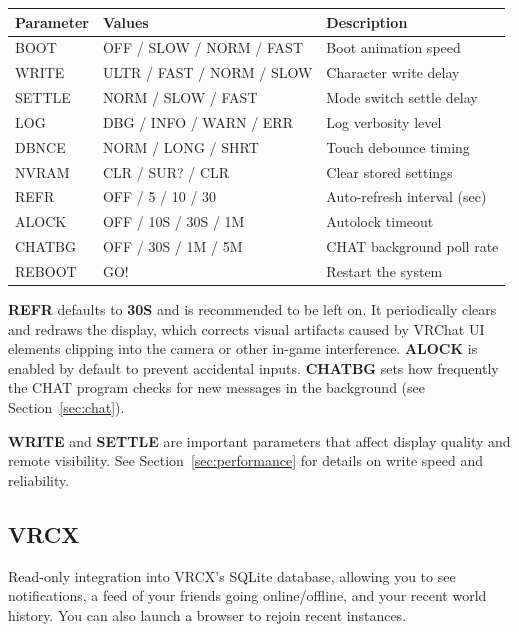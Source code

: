 \documentclass[10pt]{article}
\begin{document}
\begin{center}
{\small
\begin{tabular}{lll}
  \toprule
  \textbf{Parameter} & \textbf{Values} & \textbf{Description} \\
  \midrule
  BOOT & OFF / SLOW / NORM / FAST & Boot animation speed \\
  WRITE & ULTR / FAST / NORM / SLOW & Character write delay \\
  SETTLE & NORM / SLOW / FAST & Mode switch settle delay \\
  LOG & DBG / INFO / WARN / ERR & Log verbosity level \\
  DBNCE & NORM / LONG / SHRT & Touch debounce timing \\
  NVRAM & CLR / SUR? / CLR & Clear stored settings \\
  REFR & OFF / 5 / 10 / 30 & Auto-refresh interval (sec) \\
  ALOCK & OFF / 10S / 30S / 1M & Autolock timeout \\
  CHATBG & OFF / 30S / 1M / 5M & CHAT background poll rate \\
  REBOOT & GO! & Restart the system \\
  \bottomrule
\end{tabular}
}
\end{center}

\begin{notebox}
\textbf{REFR} defaults to \textbf{30S} and is recommended to be left on. It periodically clears and redraws the display, which corrects visual artifacts caused by VRChat UI elements clipping into the camera or other in-game interference. \textbf{ALOCK} is enabled by default to prevent accidental inputs. \textbf{CHATBG} sets how frequently the CHAT program checks for new messages in the background (see Section~\ref{sec:chat}).
\end{notebox}

\begin{notebox}
\textbf{WRITE} and \textbf{SETTLE} are important parameters that affect display quality and remote visibility. See Section~\ref{sec:performance} for details on write speed and reliability.
\end{notebox}

\newpage
\subsection{VRCX}
\label{sec:vrcx}

Read-only integration into VRCX's SQLite database, allowing you to see notifications, a feed of your friends going online/offline, and your recent world history. You can also launch a browser to rejoin recent instances.
\end{document}
